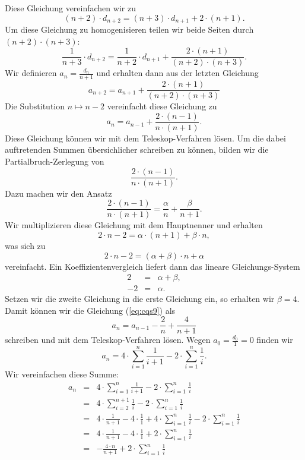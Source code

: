 Diese Gleichung vereinfachen wir zu
\begin{equation}
  \label{eq:cqs7}
(n+2)\cdot d_{n+2} = (n+3)\cdot \displaystyle d_{n+1} + 2\cdot(n+1).  
\end{equation}
Um diese Gleichung zu homogenisieren teilen wir beide Seiten durch $(n+2) \cdot(n+3)$:
\begin{equation}
  \label{eq:cqs8}
 \frac{1}{n+3} \cdot d_{n+2} = \frac{1}{n+2}\cdot d_{n+1} + \frac{2\cdot(n+1)}{(n+2)\cdot(n+3)}.
\end{equation}
Wir definieren $\displaystyle a_n = \frac{d_n}{n+1}$ und erhalten dann aus der
letzten Gleichung 
\[ a_{n+2} = a_{n+1} + \frac{2\cdot(n+1)}{(n+2)\cdot(n+3)} \]
Die Substitution $n \mapsto n-2$ vereinfacht diese Gleichung zu 
\begin{equation}
  \label{eq:cqs9}
 a_{n} = a_{n-1} + \frac{2\cdot(n-1)}{n\cdot(n+1)}.
\end{equation}
Diese Gleichung k\"onnen wir mit dem Teleskop-Verfahren l\"osen.  Um die dabei auftretenden Summen \"ubersichlicher
schreiben zu k\"onnen,  bilden wir die Partialbruch-Zerlegung von 
\[ \frac{2\cdot(n-1)}{n\cdot(n+1)}. \] 
Dazu machen wir den Ansatz
\[ \frac{2\cdot(n-1)}{n\cdot(n+1)} = \frac{\alpha}{n} + \frac{\beta}{n+1}.\]
Wir multiplizieren diese Gleichung mit dem Hauptnenner und erhalten
\[ 2\cdot n - 2 = \alpha \cdot (n+1) + \beta \cdot n, \]
was sich zu 
\[ 2\cdot n - 2 = (\alpha + \beta) \cdot n + \alpha \]
vereinfacht.  Ein Koeffizientenvergleich liefert dann das lineare Gleichungs-System
\begin{eqnarray*}
  2 & = & \alpha + \beta, \\
 -2 & = & \alpha.
\end{eqnarray*}
Setzen wir die zweite Gleichung in die erste Gleichung ein, so erhalten wir $\beta = 4$.
Damit k\"onnen wir die Gleichung (\ref{eq:cqs9}) als 
\begin{equation}
  \label{eq:cqs10}
 a_{n} = a_{n-1} - \frac{2}{n} + \frac{4}{n+1}  
\end{equation}
schreiben und mit  dem Teleskop-Verfahren l\"osen.  Wegen $a_0 = \frac{d_0}{1} = 0$ finden wir
\begin{equation}
  \label{eq:cqs11}
 a_{n} = 4 \cdot \sum_{i=1}^n \frac{1}{i+1} - 2 \cdot \sum_{i=1}^n \frac{1}{i}.  
\end{equation}
Wir vereinfachen diese Summe:
\[
\begin{array}{lcl}
 a_{n} & = & \displaystyle 4 \cdot \sum_{i=1}^n \frac{1}{i+1} - 2 \cdot \sum_{i=1}^n \frac{1}{i} \\[0.5cm]
       & = & \displaystyle 4 \cdot \sum_{i=2}^{n+1} \frac{1}{i} - 2 \cdot \sum_{i=1}^n \frac{1}{i} \\[0.5cm]
       & = & \displaystyle 4 \cdot \frac{1}{n+1} - 4 \cdot \frac{1}{1} + 4 \cdot \sum_{i=1}^{n} \frac{1}{i} - 2 \cdot \sum_{i=1}^n \frac{1}{i} \\[0.5cm]
       & = & \displaystyle 4 \cdot \frac{1}{n+1} - 4 \cdot \frac{1}{1} + 2 \cdot \sum_{i=1}^{n} \frac{1}{i}  \\[0.5cm]
       & = & \displaystyle - \frac{4 \cdot n}{n+1}  + 2 \cdot \sum_{i=1}^{n} \frac{1}{i}  
\end{array}
\]
